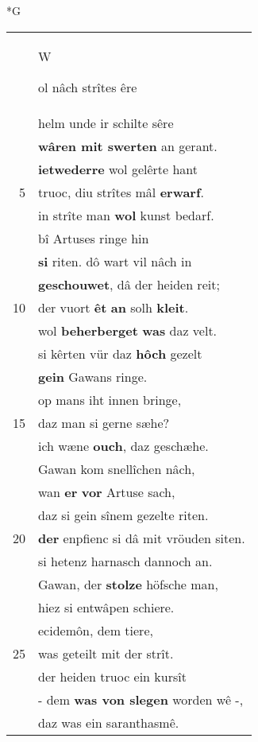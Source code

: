 \documentclass[8pt,a4paper,notitlepage]{article}
\begin{document}
\begin{table}[ht]
\begin{minipage}[t]{0.5\linewidth}
\small
\begin{center}*G
\end{center}
\begin{tabular}{rl}
 & \begin{large}W\end{large}ol nâch strîtes êre\\ 
 & helm unde ir schilte sêre\\ 
 & \textbf{wâren mit swerten} an gerant.\\ 
 & \textbf{ietwederre} wol gelêrte hant\\ 
5 & truoc, diu strîtes mâl \textbf{erwarf}.\\ 
 & in strîte man \textbf{wol} kunst bedarf.\\ 
 & bî Artuses ringe hin\\ 
 & \textbf{si} riten. dô wart vil nâch in\\ 
 & \textbf{geschouwet}, dâ der heiden reit;\\ 
10 & der vuort \textbf{êt} \textbf{an} solh \textbf{kleit}.\\ 
 & wol \textbf{beherberget} \textbf{was} daz velt.\\ 
 & si kêrten vür daz \textbf{hôch} gezelt\\ 
 & \textbf{gein} Gawans ringe.\\ 
 & op mans iht innen bringe,\\ 
15 & daz man si gerne sæhe?\\ 
 & ich wæne \textbf{ouch}, daz geschæhe.\\ 
 & Gawan kom snellîchen nâch,\\ 
 & wan \textbf{er} \textbf{vor} Artuse sach,\\ 
 & daz si gein sînem gezelte riten.\\ 
20 & \textbf{der} enpfienc si dâ mit vröuden siten.\\ 
 & si hetenz harnasch dannoch an.\\ 
 & Gawan, der \textbf{stolze} höfsche man,\\ 
 & hiez si entwâpen schiere.\\ 
 & ecidemôn, dem tiere,\\ 
25 & was geteilt mit der strît.\\ 
 & der heiden truoc ein kursît\\ 
 & - dem \textbf{was von slegen} worden wê -,\\ 
 & daz was ein saranthasmê.\\ 

\end{tabular}
\end{minipage}
\end{table}
\end{document}
